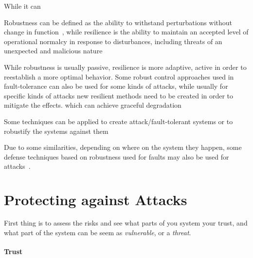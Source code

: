 \documentclass[../main.tex]{subfiles}
\begin{document}
While it can

Robustness can be defined as the ability to withstand perturbations without change in function~\cite{Jen2003}, while resilience
  is the ability to maintain an accepted level of operational normalcy  in  response  to  disturbances,  including  threats  of  an unexpected and malicious nature\cite{Rieger2010}

While robustness is usually passive, resilience is more adaptive, active in order to reestablish a more optimal behavior.
Some robust control approaches used in fault-tolerance can also be used for some kinds of attacks, while usually for specific kinds of attacks new resilient methods need to be created in order to mitigate the effects.
which can achieve graceful degradation


Some techniques can be applied to create attack/fault-tolerant systems or to robustify the systems against them\cite{DingEtAl2018,SatchidanandanKumar2017}

Due to some similarities, depending on where on the system they happen, some defense techniques based on robustness used for faults may also be used for attacks~\cite{TeixeiraEtAl2015}.



\section{Protecting against Attacks}\label{sec:protecting_against_attacks}
First thing is to assess the risks and see what parts of you system your trust, and what part of the system can be seem as \emph{vulnerable}, or a \emph{threat}.


\paragraph{Trust}
\end{document}
